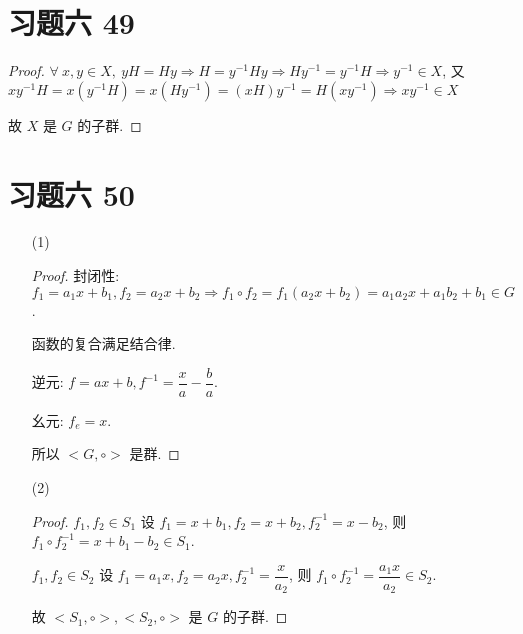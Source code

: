\section{习题六 49}

\begin{proof}
	$\forall\ x,y\in X,\ yH=Hy\Rightarrow H=y^{-1}Hy\Rightarrow Hy^{-1}=y^{-1}H\Rightarrow y^{-1}\in X$, 
	又 $xy^{-1}H=x(y^{-1}H)=x(Hy^{-1})=(xH)y^{-1}=H(xy^{-1})\Rightarrow xy^{-1}\in X$
	
	故 $X$ 是 $G$ 的子群.
\end{proof}

\section{习题六 50}

\begin{itemize}
	\item[(1)]
	\begin{proof}
		封闭性: $f_1=a_1x+b_1,f_2=a_2x+b_2\Rightarrow f_1\circ f_2=f_1(a_2x+b_2)=a_1a_2x+a_1b_2+b_1\in G$.
		
		函数的复合满足结合律.
		
		逆元: $f=ax+b,f^{-1}=\dfrac{x}{a}-\dfrac b a$.
		
		幺元: $f_e=x$.
		
		所以 $<G,\circ>$ 是群.
	\end{proof}
	\item[(2)]
	\begin{proof}
		$f_1,f_2\in S_1$ 设 $f_1=x+b_1,f_2=x+b_2,f_2^{-1}=x-b_2$, 则 $f_1\circ f_2^{-1}=x+b_1-b_2\in S_1$.
		
		$f_1,f_2\in S_2$ 设 $f_1=a_1x,f_2=a_2x,f_2^{-1}=\dfrac{x}{a_2}$, 则 $f_1\circ f_2^{-1}=\dfrac{a_1x}{a_2}\in S_2$.
		
		故 $<S_1,\circ>,<S_2,\circ>$ 是 $G$ 的子群.
	\end{proof}
\end{itemize}